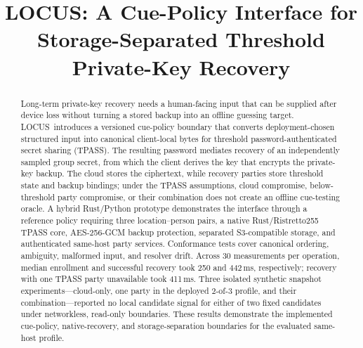 \documentclass[sigconf,anonymous]{acmart}
\newcounter{protocol}
\newcommand{\LOCUS}{\textsf{LOCUS}}
\begin{document}
\title{LOCUS: A Cue-Policy Interface for Storage-Separated Threshold Private-Key Recovery}
\renewcommand{\shortauthors}{anonymous}

\begin{abstract}

Long-term private-key recovery needs a human-facing input that can be supplied after device loss without turning a stored backup into an offline guessing target. \LOCUS\ introduces a versioned cue-policy boundary that converts deployment-chosen structured input into canonical client-local bytes for threshold password-authenticated secret sharing (TPASS). The resulting password mediates recovery of an independently sampled group secret, from which the client derives the key that encrypts the private-key backup. The cloud stores the ciphertext, while recovery parties store threshold state and backup bindings; under the TPASS assumptions, cloud compromise, below-threshold party compromise, or their combination does not create an offline cue-testing oracle. A hybrid Rust/Python prototype demonstrates the interface through a reference policy requiring three location--person pairs, a native Rust/Ristretto255 TPASS core, AES-256-GCM backup protection, separated S3-compatible storage, and authenticated same-host party services. Conformance tests cover canonical ordering, ambiguity, malformed input, and resolver drift. Across 30 measurements per operation, median enrollment and successful recovery took 250 and 442\,ms, respectively; recovery with one TPASS party unavailable took 411\,ms. Three isolated synthetic snapshot experiments---cloud-only, one party in the deployed 2-of-3 profile, and their combination---reported no local candidate signal for either of two fixed candidates under networkless, read-only boundaries. These results demonstrate the implemented cue-policy, native-recovery, and storage-separation boundaries for the evaluated same-host profile.

\end{abstract}



\maketitle
\end{document}
